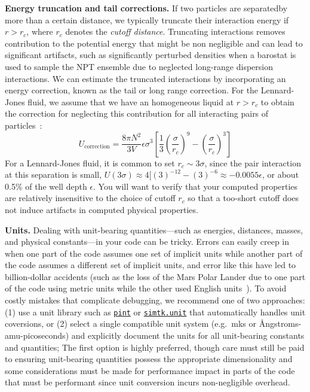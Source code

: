 \documentclass[aip,jcp,preprint,superscriptaddress,floatfix]{revtex4-1}
\begin{document}
\textbf{Energy truncation and tail corrections.} 
If two particles are separatedby more than a certain distance, we typically truncate their interaction energy if $r > r_c$, where $r_c$ denotes the \emph{cutoff distance}. 
Truncating interactions removes contribution to the potential energy that might be non negligible and can lead to significant artifacts, such as significantly perturbed densities when a barostat is used to sample the NPT ensemble due to neglected long-range dispersion interactions. 
We can estimate the truncated interactions by incorporating an energy 
correction, known as the tail or long range correction.
For the Lennard-Jones fluid, we assume that we have an homogeneous liquid at $r>r_c$ to obtain the correction for neglecting this contribution for all interacting pairs of particles~\cite{Shirts.JPCB.111.13052.2007}:
\begin{equation}
	U_\mathrm{correction} = \frac{8 \pi N^2}{3 V} \epsilon \sigma^3
	\left[\frac{1}{3} \left(\frac{\sigma}{r_c} \right)^9 
	- \left(\frac{\sigma}{r_c} \right)^3 \right]
\end{equation}
For a Lennard-Jones fluid, it is common to set $r_c \sim 3 \sigma$, since the pair interaction at this separation is small, $U(3 \sigma) \approx 4 [(3)^{-12} - (3)^{-6} \approx - 0.0055 \epsilon$, or about 0.5\% of the well depth $\epsilon$.
You will want to verify that your computed properties are relatively insensitive to the choice of cutoff $r_c$ so that a too-short cutoff does not induce artifacts in computed physical properties.

\textbf{Units.}
Dealing with unit-bearing quantities---such as energies, distances, masses, and physical constants---in your code can be tricky.
Errors can easily creep in when one part of the code assumes one set of implicit units while another part of the code assumes a different set of implicit units, and error like this have led to billion-dollar accidents (such as the loss of the Mars Polar Lander due to one part of the code using metric units while the other used English units~\cite{MarsPolarLander}).
To avoid costly mistakes that complicate debugging, we recommend one of two approaches:
(1) use a unit library such as \href{http://pint.readthedocs.io/}{\tt pint} or \href{http://docs.openmm.org/7.1.0/userguide/library.html#units-and-dimensional-analysis}{\tt simtk.unit} that automatically handles unit coversions,
or (2) select a single compatible unit system (e.g.~mks or {\AA}ngstroms-amu-picoseconds) and explicitly document the units for all unit-bearing constants and quantities;
The first option is highly preferred, though care must still be paid to ensuring unit-bearing quantities possess the appropriate dimensionality and some considerations must be made for performance impact in parts of the code that must be performant since unit conversion incurs non-negligible overhead.
\end{document}
